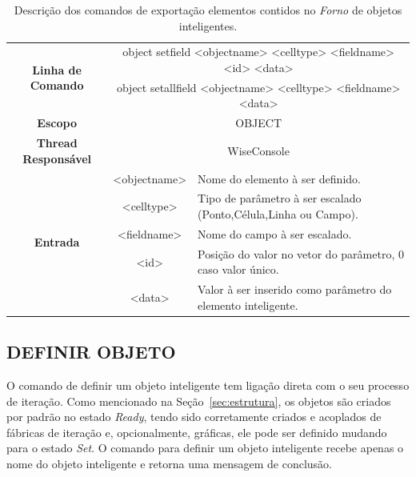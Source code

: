 \begin{center}
	\begin{table}[!htbp]
		\begin{tabularx}{\textwidth}{c|c|X}
			\toprule
			\multirow{2}{*}{\textbf{Linha de Comando}} & \multicolumn{2}{c}{object set\underline{\space\space}field <object\underline{\space\space}name> <cell\underline{\space\space}type> <field\underline{\space\space}name> <id> <data>} \\
			& \multicolumn{2}{c}{object set\underline{\space\space}all\underline{\space\space}field <object\underline{\space\space}name> <cell\underline{\space\space}type> <field\underline{\space\space}name> <data>} \\
			\midrule
			\textbf{Escopo} & \multicolumn{2}{c}{OBJECT} \\
			\hline
			\textbf{Thread Responsável} & \multicolumn{2}{c}{WiseConsole} \\
			\hline
			\multirow{5}{*}{\textbf{Entrada}} & <object\underline{\space\space}name> & Nome do elemento à ser definido. \\
			& <cell\underline{\space\space}type> & Tipo de parâmetro à ser escalado (Ponto,Célula,Linha ou Campo). \\
			& <field\underline{\space\space}name> & Nome do campo à ser escalado. \\
			& <id> & Posição do valor no vetor do parâmetro, 0 caso valor único. \\
			& <data> & Valor à ser inserido como parâmetro do elemento inteligente. \\
			\bottomrule
		\end{tabularx}
		\caption{Descrição dos comandos de exportação elementos contidos no \textit{Forno} de objetos inteligentes.}
		\label{tab:set_field_object}
	\end{table}
\end{center}

\subsection{DEFINIR OBJETO}\label{sec:set_object}

O comando de definir um objeto inteligente tem ligação direta com o seu processo de iteração. Como mencionado na Seção~\ref{sec:estrutura}, os objetos são criados por padrão no estado \textit{Ready}, tendo sido corretamente criados e acoplados de fábricas de iteração e, opcionalmente, gráficas, ele pode ser definido mudando para o estado \textit{Set}. O comando para definir um objeto inteligente recebe apenas o nome do objeto inteligente e retorna uma mensagem de conclusão.

